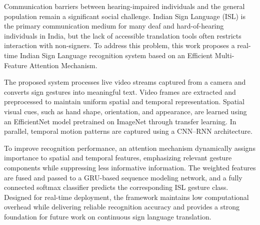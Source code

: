 \begin{abstractenglish}
Communication barriers between hearing-impaired individuals and the general population remain a significant social challenge. Indian Sign Language (ISL) is the primary communication medium for many deaf and hard-of-hearing individuals in India, but the lack of accessible translation tools often restricts interaction with non-signers. To address this problem, this work proposes a real-time Indian Sign Language recognition system based on an Efficient Multi-Feature Attention Mechanism.

The proposed system processes live video streams captured from a camera and converts sign gestures into meaningful text. Video frames are extracted and preprocessed to maintain uniform spatial and temporal representation. Spatial visual cues, such as hand shape, orientation, and appearance, are learned using an EfficientNet model pretrained on ImageNet through transfer learning. In parallel, temporal motion patterns are captured using a CNN--RNN architecture.

To improve recognition performance, an attention mechanism dynamically assigns importance to spatial and temporal features, emphasizing relevant gesture components while suppressing less informative information. The weighted features are fused and passed to a GRU-based sequence modeling network, and a fully connected softmax classifier predicts the corresponding ISL gesture class. Designed for real-time deployment, the framework maintains low computational overhead while delivering reliable recognition accuracy and provides a strong foundation for future work on continuous sign language translation.
\end{abstractenglish}

